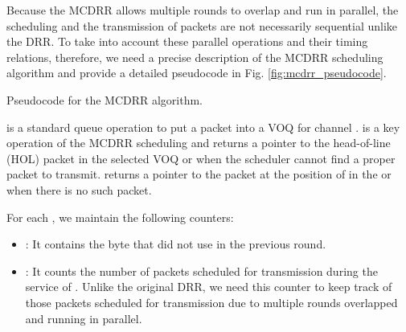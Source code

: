 \documentclass[conference,letterpaper]{IEEEtran}
\begin{document}
Because the MCDRR allows multiple rounds to overlap and run in parallel, the
scheduling and the transmission of packets are not necessarily sequential unlike
the DRR. To take into account these parallel operations and their timing
relations, therefore, we need a precise description of the MCDRR scheduling
algorithm and provide a detailed pseudocode in Fig. \ref{fig:mcdrr_pseudocode}.
\begin{algorithm}[hbtp]
  \Initialization{}\;
  \For{ \KwTo }{
    \;
}
  \BlankLine
  \;
  \BlankLine
  \Dequeue{}\;
  \;
  \;
  \BlankLine
  \;
  \;
  \caption{Pseudocode for the MCDRR algorithm.}
  \label{fig:mcdrr_pseudocode}
\end{algorithm}

 is a standard queue operation to put a packet  into a VOQ for
channel .  is a key operation of the MCDRR scheduling and returns
a pointer to the head-of-line (HOL) packet in the selected VOQ or  when
the scheduler cannot find a proper packet to transmit. 
returns a pointer to the packet at the position of  in the  or
 when there is no such packet.

For each , we maintain the following counters:
\begin{itemize}
\item : It contains the byte that  did not use in the previous
  round.
\item : It counts the number of packets scheduled for
  transmission during the service of . Unlike the original DRR, we need
  this counter to keep track of those packets scheduled for transmission due to
  multiple rounds overlapped and running in parallel.
\end{itemize}
\end{document}
